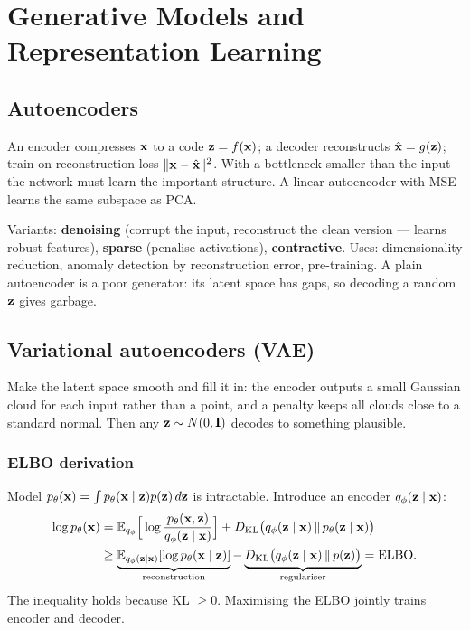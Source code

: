 \chapter{Generative Models and Representation Learning}

\section{Autoencoders}
An encoder compresses $\mathbf{x}$ to a code $\mathbf{z}=f(\mathbf{x})$; a decoder reconstructs $\hat{\mathbf{x}}=g(\mathbf{z})$; train on reconstruction loss $\|\mathbf{x}-\hat{\mathbf{x}}\|^2$. With a bottleneck smaller than the input the network must learn the important structure. A linear autoencoder with MSE learns the same subspace as PCA.

Variants: \textbf{denoising} (corrupt the input, reconstruct the clean version --- learns robust features), \textbf{sparse} (penalise activations), \textbf{contractive}. Uses: dimensionality reduction, anomaly detection by reconstruction error, pre-training. A plain autoencoder is a poor generator: its latent space has gaps, so decoding a random $\mathbf{z}$ gives garbage.

\section{Variational autoencoders (VAE)}
\begin{intuition}
Make the latent space smooth and fill it in: the encoder outputs a small Gaussian cloud for each input rather than a point, and a penalty keeps all clouds close to a standard normal. Then any $\mathbf{z}\sim N(0,\mathbf{I})$ decodes to something plausible.
\end{intuition}

\subsection{ELBO derivation}
Model $p_\theta(\mathbf{x})=\int p_\theta(\mathbf{x}\mid\mathbf{z})p(\mathbf{z})\,d\mathbf{z}$ is intractable. Introduce an encoder $q_\phi(\mathbf{z}\mid\mathbf{x})$:
\begin{align*}
\log p_\theta(\mathbf{x})&=\mathbb{E}_{q_\phi}\Big[\log\frac{p_\theta(\mathbf{x},\mathbf{z})}{q_\phi(\mathbf{z}\mid\mathbf{x})}\Big]+D_{\mathrm{KL}}\big(q_\phi(\mathbf{z}\mid\mathbf{x})\,\|\,p_\theta(\mathbf{z}\mid\mathbf{x})\big)\\
&\ge\underbrace{\mathbb{E}_{q_\phi(\mathbf{z}\mid\mathbf{x})}[\log p_\theta(\mathbf{x}\mid\mathbf{z})]}_{\text{reconstruction}}-\underbrace{D_{\mathrm{KL}}\big(q_\phi(\mathbf{z}\mid\mathbf{x})\,\|\,p(\mathbf{z})\big)}_{\text{regulariser}}=\text{ELBO}.
\end{align*}
The inequality holds because KL $\ge0$. Maximising the ELBO jointly trains encoder and decoder.

